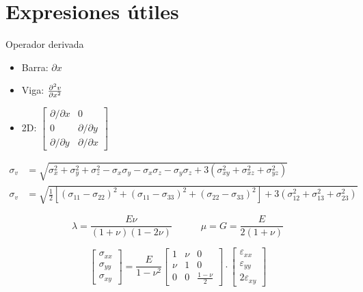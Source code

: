 \section*{Expresiones útiles}
Operador derivada
\begin{itemize}
	\item Barra: $\partial x$
	\item Viga: $\frac{\partial^2 v}{\partial x ^2}$
	\item 2D: $\begin{bmatrix}
	\partial/\partial x & 0\\
	0 & \partial/\partial y \\
	\partial/\partial y & \partial/\partial x
	\end{bmatrix}$
	
\end{itemize}

\begin{align}
\sigma_{v}&=\sqrt{\sigma_{x}^2+\sigma_{y}^2+\sigma_{z}^2 - \sigma_x \sigma_y-\sigma_x\sigma_z -\sigma_y \sigma_z +3(\sigma_{xy}^2+\sigma_{xz}^2 +\sigma_{yz}^2)} \\
\sigma_{v}&=\sqrt{\tfrac{1}{2}\left[  (\sigma_{11}-\sigma_{22})^2+(\sigma_{11}-\sigma_{33})^2+(\sigma_{22}-\sigma_{33})^2\right] +3(\sigma_{12}^2+\sigma_{13}^2 +\sigma_{23}^2)}
\end{align}

\begin{equation}
\lambda = \frac{E \nu}{(1+\nu)(1-2\nu)} \qquad\quad \mu=G=\frac{E}{2(1+\nu)}
\end{equation}

\begin{equation}
\begin{bmatrix}
\sigma_{xx} \\
\sigma_{yy} \\
\sigma_{xy}
\end{bmatrix}
={\frac{E}{1-\nu^2}} 
\begin{bmatrix}
1 & \nu & 0 \\
\nu & 1 &0 \\
0 & 0 & \frac{1-\nu}{2}
\end{bmatrix}
\cdot
\begin{bmatrix}
\varepsilon_{xx} \\
\varepsilon_{yy} \\
2\varepsilon_{xy}
\end{bmatrix}
\end{equation}

